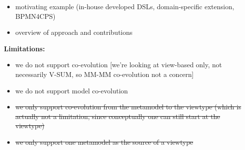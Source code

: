 \begin{itemize}
    \item motivating example (in-house developed DSLs, domain-specific \metamodel extension, BPMN4CPS)
    \item overview of approach and contributions
\end{itemize}

\textbf{Limitations:}
\begin{itemize}
    \item we do not support \metamodel \metamodel co-evolution [we’re looking at view-based only, not necessarily V-SUM, so MM-MM co-evolution not a concern]
    \item we do not support \metamodel model co-evolution
    \item \st{we only support co-evolution from the metamodel to the viewtype (which is actually not a limitation, since conceptually one can still start at the viewtype)}
    \item \st{we only support one metamodel as the source of a viewtype}
\end{itemize}


